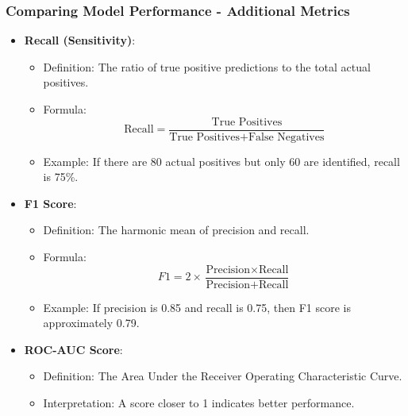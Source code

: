 \documentclass[aspectratio=169]{beamer}
\begin{document}
\begin{frame}[fragile]
    \frametitle{Comparing Model Performance - Additional Metrics}
    \begin{itemize}
        \item \textbf{Recall (Sensitivity)}:
            \begin{itemize}
                \item Definition: The ratio of true positive predictions to the total actual positives.
                \item Formula:
                \begin{equation}
                    \text{Recall} = \frac{\text{True Positives}}{\text{True Positives} + \text{False Negatives}}
                \end{equation}
                \item Example: If there are 80 actual positives but only 60 are identified, recall is 75\%.
            \end{itemize}
        
        \item \textbf{F1 Score}:
            \begin{itemize}
                \item Definition: The harmonic mean of precision and recall.
                \item Formula: 
                \begin{equation}
                    F1 = 2 \times \frac{\text{Precision} \times \text{Recall}}{\text{Precision} + \text{Recall}}
                \end{equation}
                \item Example: If precision is 0.85 and recall is 0.75, then F1 score is approximately 0.79.
            \end{itemize}
        
        \item \textbf{ROC-AUC Score}:
            \begin{itemize}
                \item Definition: The Area Under the Receiver Operating Characteristic Curve.
                \item Interpretation: A score closer to 1 indicates better performance.
            \end{itemize}
    \end{itemize}
\end{frame}
\end{document}
